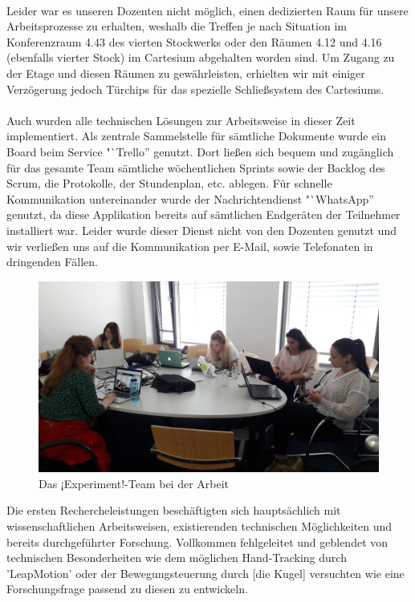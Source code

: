 \documentclass{Bericht}
\begin{document}
\\
		Leider war es unseren Dozenten nicht möglich, einen dedizierten Raum für unsere Arbeitsprozesse zu erhalten, weshalb die Treffen je nach Situation im Konferenzraum 4.43 des vierten Stockwerks oder den Räumen 4.12 und 4.16 (ebenfalls vierter Stock) im Cartesium abgehalten worden sind. Um Zugang zu der Etage und diesen Räumen zu gewährleisten, erhielten wir mit einiger Verzögerung jedoch Türchips für das spezielle Schließsystem des Cartesiums.\\
\\
\newpage
		Auch wurden alle technischen Lösungen zur Arbeitsweise in dieser Zeit implementiert. Als zentrale Sammelstelle für sämtliche Dokumente wurde ein Board beim Service "`Trello'' genutzt. Dort ließen sich bequem und zugänglich für das gesamte Team sämtliche wöchentlichen Sprints sowie der Backlog des Scrum, die Protokolle, der Stundenplan, etc. ablegen. Für schnelle Kommunikation untereinander wurde der Nachrichtendienst "`WhatsApp'' genutzt, da diese Applikation bereits auf sämtlichen Endgeräten der Teilnehmer installiert war. Leider wurde dieser Dienst nicht von den Dozenten genutzt und wir verließen uns auf die Kommunikation per E-Mail, sowie Telefonaten in dringenden Fällen.\\
		\begin{figure}[H] %
			\centering
			\includegraphics[width=\linewidth, height=\textheight, keepaspectratio]{../Bilder/20170518_103125.jpg}
			\caption{Das ¡Experiment!-Team bei der Arbeit}
			\label{img:experiment-team-bei-der-arbeit}
		\end{figure}
		Die ersten Rechercheleistungen beschäftigten sich hauptsächlich mit wissenschaftlichen Arbeitsweisen, existierenden technischen Möglichkeiten und bereits durchgeführter Forschung. Vollkommen fehlgeleitet und geblendet von technischen Besonderheiten wie dem möglichen Hand-Tracking durch 'LeapMotion' oder der Bewegungsteuerung durch [die Kugel] versuchten wie eine Forschungsfrage passend zu diesen zu entwickeln.\\
\end{document}
